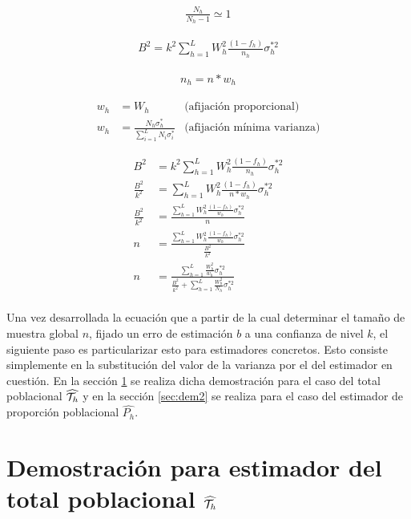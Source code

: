 \documentclass{article}
\begin{document}
    \begin{align}
      \frac{N_h}{N_h -1} \simeq 1
    \end{align}

    \begin{align}
      B^2 = k^2 \sum\limits_{h=1}^L W_h^2 \frac{(1-f_h)}{n_h}\sigma_h^{*2}
    \end{align}

    \begin{align}
      n_h = n*w_h
    \end{align}

    \begin{align}
      w_h &= W_h &\text{(afijación proporcional)}\\
      w_h &= \frac{N_h\sigma_h^*}{\sum\limits_{i=1}^LN_i\sigma_i^*}&\text{(afijación mínima varianza)}
    \end{align}

    \begin{align}
      B^2 &= k^2 \sum\limits_{h=1}^L W_h^2 \frac{(1-f_h)}{n_h}\sigma_h^{*2} \\
      \frac{B^2}{k^2} &=  \sum\limits_{h=1}^L W_h^2 \frac{(1-f_h)}{n*w_h}\sigma_h^{*2} \\
      \frac{B^2}{k^2} &=  \frac{\sum\limits_{h=1}^L W_h^2 \frac{(1-f_h)}{w_h}\sigma_h^{*2}}{n} \\
      n &=  \frac{\sum\limits_{h=1}^L W_h^2 \frac{(1-f_h)}{w_h}\sigma_h^{*2}}{\frac{B^2}{k^2}} \\
      n &= \frac{\sum\limits_{h=1}^L\frac{W_h^2}{w_h}\sigma_h^{*2}}{\frac{B^2}{k^2}+\sum\limits_{h=1}^L\frac{W_h^2}{N_h}\sigma_h^{*2}}
    \end{align}

    \paragraph{}
    Una vez desarrollada la ecuación que a partir de la cual determinar el tamaño de muestra global $n$, fijado un erro de estimación $b$ a una confianza de nivel $k$, el siguiente paso es particularizar esto para estimadores concretos. Esto consiste simplemente en la substitución del valor de la varianza por el del estimador en cuestión. En la sección \ref{sec:dem1} se realiza dicha demostración para el caso del total poblacional $\widehat{\mathcal{T}_h}$ y en la sección \ref{sec:dem2} se realiza para el caso del estimador de proporción poblacional $\widehat{P_h}$.


  \section{Demostración para estimador del total poblacional $\widehat{\mathcal{T}_h}$}
  \label{sec:dem1}
\end{document}

